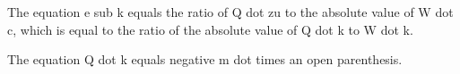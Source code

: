 The equation e sub k equals the ratio of Q dot zu to the absolute value of W dot c, which is equal to the ratio of the absolute value of Q dot k to W dot k.

The equation Q dot k equals negative m dot times an open parenthesis.